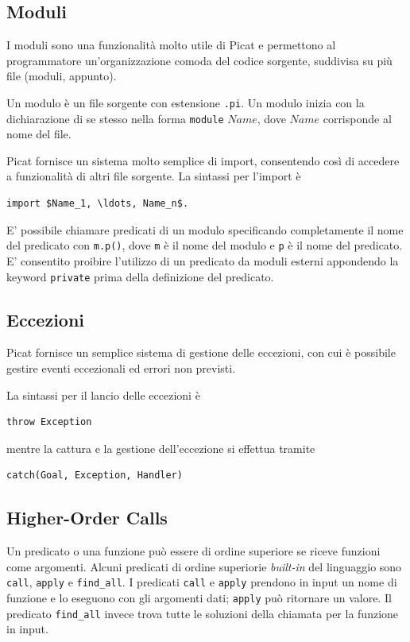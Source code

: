 \documentclass[12pt,a4paper,openright]{book} %
\begin{document}
\subsection{Moduli}
\label{sec:picat_advanced_modules}

I moduli sono una funzionalità molto utile di Picat e permettono al programmatore un'organizzazione comoda del codice sorgente, suddivisa su più file (moduli, appunto).

Un modulo è un file sorgente con estensione \verb|.pi|. Un modulo inizia con la dichiarazione di se stesso nella forma \verb|module| $Name$, dove $Name$ corrisponde al nome del file.

Picat fornisce un sistema molto semplice di import, consentendo così di accedere a funzionalità di altri file sorgente. La sintassi per l'import è 
\begin{lstlisting}
import $Name_1, \ldots, Name_n$.
\end{lstlisting}

E' possibile chiamare predicati di un modulo specificando completamente il nome del predicato con \verb|m.p()|, dove \verb|m| è il nome del modulo e \verb|p| è il nome del predicato. E' consentito proibire l'utilizzo di un predicato da moduli esterni appondendo la keyword \verb|private| prima della definizione del predicato.

\subsection{Eccezioni}
\label{sec:picat_advanced_exceptions}

Picat fornisce un semplice sistema di gestione delle eccezioni, con cui è possibile gestire eventi eccezionali ed errori non previsti.

La sintassi per il lancio delle eccezioni è 
\begin{lstlisting}
throw Exception
\end{lstlisting}
mentre la cattura e la gestione dell'eccezione si effettua tramite
\begin{lstlisting}
catch(Goal, Exception, Handler)
\end{lstlisting}

\subsection{Higher-Order Calls}
\label{sec:picat_advanced_hoc}

Un predicato o una funzione può essere di ordine superiore se riceve funzioni come argomenti. Alcuni predicati di ordine superiorie \emph{built-in} del linguaggio sono \verb|call|, \verb|apply| e \verb|find_all|. I predicati \verb|call| e \verb|apply| prendono in input un nome di funzione e lo eseguono con gli argomenti dati; \verb|apply| può ritornare un valore. Il predicato \verb|find_all| invece trova tutte le soluzioni della chiamata per la funzione in input.
\end{document}
